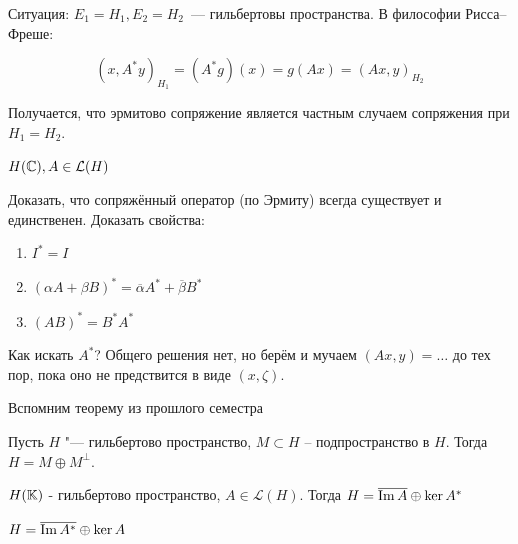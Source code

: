 Ситуация: $E_1 = H_1, E_2 = H_2$~--- гильбертовы пространства.
В философии Рисса--Фреше:

\[ (x, A^*y)_{H_1}=(A^* g)(x)=g(Ax)=(Ax,y)_{H_2}\]

Получается, что эрмитово сопряжение является частным случаем сопряжения при $H_1=H_2$.

$H(\mathbb{C}), A \in \mathcal{L}(H)$
\begin{unnecessary}
    \begin{exercise}
    Доказать, что сопряжённый оператор (по Эрмиту) всегда существует и единственен. Доказать свойства:
    
    
    \begin{enumerate}
        \item $I^* = I$
        \item $(\alpha A + \beta B)^* = \overline{\alpha} A^* + \overline{\beta} B^*$
        \item $(AB)^* = B^* A^*$
    \end{enumerate}
    
    \end{exercise}
    
    \begin{lemmanote}
        Как искать $A^*$? Общего решения нет, но берём и мучаем $(Ax, y) = \ldots$ до тех пор, пока оно не предствится в виде $(x, \zeta)$.
    \end{lemmanote}

    Вспомним теорему из прошлого семестра

    \begin{theorem}\label{thm4.3_reminder}
    	Пусть $H$ "--- гильбертово пространство, {$M \subset H$} -- подпространство в $H$. Тогда $H = M \oplus M^\perp$.
    \end{theorem}
\end{unnecessary}




\begin{theorem}[9.2]\label{9.2}
    $H(\mathbb{K})$ - гильбертово пространство, $A \in \mathcal{L}(H)$. 
    Тогда $H = \overline{\operatorname{Im} A} \oplus \ker A^*$
\end{theorem}

\begin{note}
$H = \overline{\operatorname{Im} A^*} \oplus \ker A$
\end{note}

